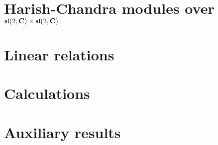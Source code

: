 \documentclass[]{./Bachelor}
\begin{document}
\frontmatter




\tableofcontents*

\mainmatter
\clearpage
\pagestyle{ruled}

\chapter{Harish-Chandra modules over \texorpdfstring{$\mathfrak{sl}(2,\mathbf{C})\times \mathfrak{sl}(2,\mathbf{C})$}{sl(2,C) x sl(2,C)}}\nocite{*}
\label{cha:first}









\chapter{Linear relations}
\label{cha:second}

\medskip

\printbibliography


\appendix

\chapter{Calculations}



















\chapter{Auxiliary results}




\end{document}
